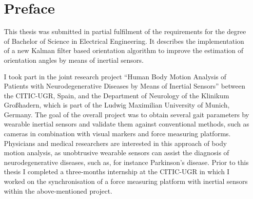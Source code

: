 \chapter{Preface}

This thesis was submitted in partial fulfilment of the requirements for the degree of Bachelor of Science in Electrical Engineering. It describes the implementation of a new Kalman filter based orientation algorithm to improve the estimation of orientation angles by means of inertial sensors.

I took part in the joint research project “Human Body Motion Analysis of Patients with Neurodegenerative Diseases by Means of Inertial Sensors” between the \gls{CITIC-UGR}, Spain, and the Department of Neurology of the Klinikum Großhadern, which is part of the Ludwig Maximilian University of Munich, Germany. The goal of the overall project was to obtain several gait parameters by wearable inertial sensors and validate them against conventional methods, such as cameras in combination with visual markers and force measuring platforms. Physicians and medical researchers are interested in this approach of body motion analysis, as unobtrusive wearable sensors can assist the diagnosis of neurodegenerative diseases, such as, for instance Parkinson's disease. Prior to this thesis I completed a three-months internship at the \gls{CITIC-UGR} in which I worked on the synchronisation of a force measuring platform with inertial sensors within the above-mentioned project.